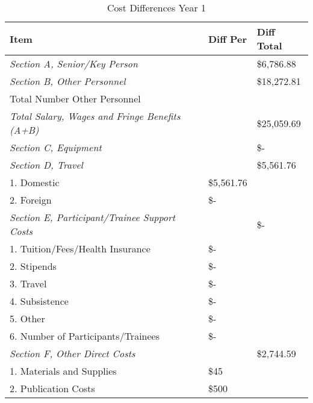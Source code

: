 \documentclass[12pt]{article}
\begin{document}
\begin{table}[h!]
\begin{center}
\caption{Cost Differences Year 1}
\begin{tabular}{ | l | l | l | }
\hline
	\textbf{Item} & \textbf{Diff Per} & \textbf{Diff Total} \\ \hline
	\textit{Section A, Senior/Key Person} &  & \$6,786.88 \\ \hline
	\textit{Section B, Other Personnel} &  & \$18,272.81 \\ \hline
	\hspace*{1 em}Total Number Other Personnel &  & \  \\ \hline
	\textit{Total Salary, Wages and Fringe Benefits (A+B)} &  & \$25,059.69 \\ \hline
	\textit{Section C, Equipment} &  &  \$-    \\ \hline
	\textit{Section D, Travel} &  & \$5,561.76 \\ \hline
	\hspace*{1 em}1.  Domestic & \$5,561.76 & \  \\ \hline
	\hspace*{1 em}2.  Foreign &  \$-    & \  \\ \hline
	\textit{Section E, Participant/Trainee Support Costs} & \ &  \$-      \\ \hline
	\hspace*{1 em}1.  Tuition/Fees/Health Insurance &  \$-    & \  \\ \hline
	\hspace*{1 em}2.  Stipends &  \$-    & \  \\ \hline
	\hspace*{1 em}3.  Travel &  \$-    & \  \\ \hline
	\hspace*{1 em}4.  Subsistence &  \$-    & \  \\ \hline
	\hspace*{1 em}5.  Other &  \$-    & \  \\ \hline
	\hspace*{1 em}6.  Number of Participants/Trainees &  \$-    & \  \\ \hline
	\textit{Section F, Other Direct Costs} &  & \$2,744.59 \\ \hline
	\hspace*{1 em}1.  Materials and Supplies & \$45 & \  \\ \hline
	\hspace*{1 em}2.  Publication Costs & \$500 & \  \\ \hline

\end{tabular}
\end{center}
\end{table}
\end{document}
